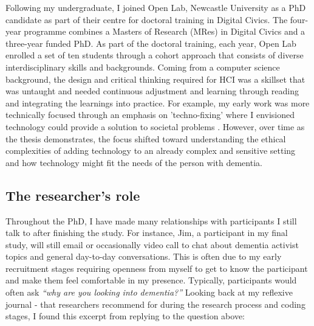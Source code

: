 Following my undergraduate, I joined Open Lab, Newcastle University as a PhD candidate as part of their centre for doctoral training in Digital Civics. The four-year programme combines a Masters of Research (MRes) in Digital Civics and a three-year funded PhD. As part of the doctoral training, each year, Open Lab enrolled a set of ten students through a cohort approach that consists of diverse interdisciplinary skills and backgrounds. Coming from a computer science background, the design and critical thinking required for HCI was a skillset that was untaught and needed continuous adjustment and learning through reading and integrating the learnings into practice. For example, my early work was more technically focused through an emphasis on 'techno-fixing' where I envisioned technology could provide a solution to societal problems \citep{jongsma2017usual}. However, over time as the thesis demonstrates, the focus shifted toward understanding the ethical complexities of adding technology to an already complex and sensitive setting and how technology might fit the needs of the person with dementia.

\subsection{The researcher's role}
\label{Reflexivity:Questions}
Throughout the PhD, I have made many relationships with participants I still talk to after finishing the study. For instance, Jim, a participant in my final study, will still email or occasionally video call to chat about dementia activist topics and general day-to-day conversations. This is often due to my early recruitment stages requiring openness from myself to get to know the participant and make them feel comfortable in my presence. Typically, participants would often ask \textit{``why are you looking into dementia?''} Looking back at my reflexive journal - that researchers recommend for during the research process and coding stages, I found this excerpt from  replying to the question above:

